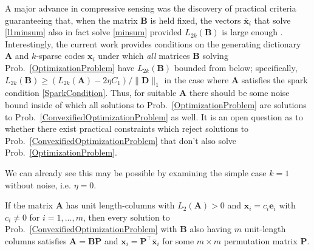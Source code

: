 A major advance in compressive sensing was the discovery of practical criteria guaranteeing that, when the matrix $\mathbf{B}$ is held fixed, the vectors $\mathbf{\overline x}_i$ that solve \eqref{l1minsum} also in fact solve \eqref{minsum} provided $L_{2k}(\mathbf{B})$ is large enough \cite{eldar2012compressed}. Interestingly, the current work provides conditions on the generating dictionary $\mathbf{A}$ and $k$-sparse codes $\mathbf{x}_i$ under which \emph{all} matrices $\mathbf{B}$ solving Prob.~\ref{OptimizationProblem} have $L_{2k}(\mathbf{B})$ bounded from below; specifically, $L_{2k}(\mathbf{B}) \geq \left(L_{2k}(\mathbf{A}) - 2\eta C_1 \right) / \|\mathbf{D}\|_1$ in the case where $\mathbf{A}$ satisfies the spark condition \eqref{SparkCondition}. Thus, for suitable $\mathbf{A}$ there should be some noise bound inside of which all solutions to Prob.~\ref{OptimizationProblem} are solutions to Prob.~\ref{ConvexifiedOptimizationProblem} as well. It is an open question as to whether there exist practical constraints which reject solutions to Prob.~\ref{ConvexifiedOptimizationProblem} that don't also solve Prob.~\ref{OptimizationProblem}.

We can already see this may be possible by examining the simple case $k=1$ without noise, i.e. $\eta = 0$.

\begin{proposition}
If the matrix $\mathbf{A}$ has unit length-columns with $L_2(\mathbf{A}) > 0$ and $\mathbf{x}_i = c_i\mathbf{e}_i$ with $c_i \neq 0$ for $i = 1, \ldots, m$, then every solution to Prob.~\ref{ConvexifiedOptimizationProblem} with $\mathbf{B}$ also having $m$ unit-length columns satisfies $\mathbf{A} = \mathbf{BP}$ and $\mathbf{x}_i = \mathbf{P}^\top \mathbf{\overline x}_i$ for some $m \times m$ permutation matrix $\mathbf{P}$.
\end{proposition}


